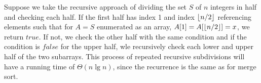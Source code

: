 
Suppose we take the recursive approach of dividing the set $S$ of $n$ integers in half
and checking each half. If the first half has index 1 and index $\lfloor n/2\rfloor$
referencing elements such that for $A = S$ enumerated as an array, 
$A[1] = A[\lfloor n/2\rfloor] = x$, we return $\mathit{true}$. If not, we check the other half
with the same condition and if the condition is $\mathit{false}$ for the upper half,
wle recursively check each lower and upper half of the two subarrays. This process of
repeated recursive subdivisions will have a running time of $\Theta(n\lg{n})$, since the 
recurrence is the same as for merge sort.
